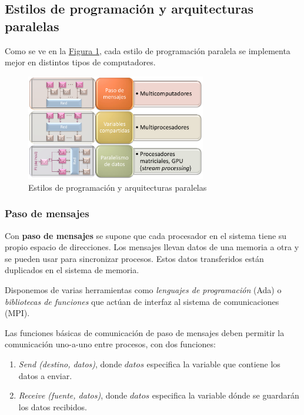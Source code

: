 \documentclass[10pt,a4paper,spanish]{report}
\begin{document}
\textcolor[rgb]{0.2,0.4,0.8}{\subsection{Estilos de programación y arquitecturas paralelas}}
Como se ve en la \hyperref[estilos_prog]{Figura \ref*{estilos_prog}}, cada estilo de programación paralela se implementa mejor en distintos tipos de computadores.


\begin{figure}[!h]
    \centering
    \includegraphics[width=0.7\textwidth]{34}
    \caption{Estilos de programación y arquitecturas paralelas}
    \label{estilos_prog}
\end{figure}

\textcolor[rgb]{0.2,0.4,0.8}{\subsubsection{Paso de mensajes}}
Con \textbf{\textcolor[rgb]{0.2,0.4,0.8}{paso de mensajes}} se supone que cada procesador en el sistema tiene su propio espacio de direcciones. Los mensajes llevan datos de una memoria a otra y se pueden usar para sincronizar procesos. Estos datos transferidos están duplicados en el sistema de memoria. 

Disponemos de varias herramientas como \textit{\textcolor[rgb]{0.2,0.4,0.8}{lenguajes de programación}} (Ada) o \textcolor[rgb]{0.2,0.4,0.8}{\textit{bibliotecas de funciones}} que actúan de interfaz al sistema de comunicaciones (MPI). 

Las funciones básicas de comunicación de paso de mensajes deben permitir la comunicación uno-a-uno entre procesos, con dos funciones:
\begin{enumerate}[\color{azul}{\bf $\heartsuit$}]
    \item \textcolor[rgb]{0.2,0.4,0.8}{\textit{Send (destino, datos)}}, donde $datos$ especifica la variable que contiene los datos a enviar.
    \item \textcolor[rgb]{0.2,0.4,0.8}{\textit{Receive (fuente, datos)}}, donde $datos$ especifica la variable dónde se guardarán los datos recibidos.
\end{enumerate}
\end{document}
